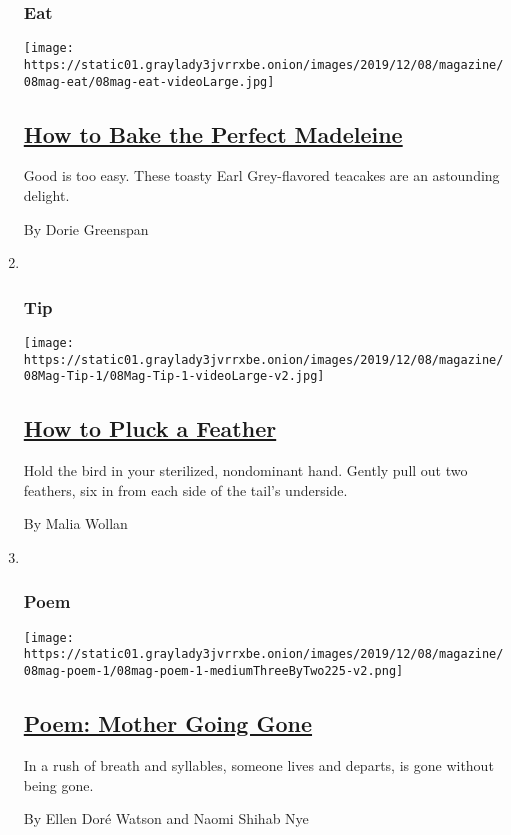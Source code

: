 \begin{enumerate}
{  \subsubsection{Eat}\label{eat}}

  \texttt{[image: https://static01.graylady3jvrrxbe.onion/images/2019/12/08/magazine/08mag-eat/08mag-eat-videoLarge.jpg]}

  \hypertarget{how-to-bake-the-perfect-madeleine}{%
  \subsection{\texorpdfstring{\href{/2019/12/03/magazine/how-to-bake-the-perfect-madeleine.html}{How
  to Bake the Perfect
  Madeleine}}{How to Bake the Perfect Madeleine}}\label{how-to-bake-the-perfect-madeleine}}

  Good is too easy. These toasty Earl Grey-flavored teacakes are an
  astounding delight.

  By Dorie Greenspan
\item ~
  \hypertarget{tip}{%
  \subsubsection{Tip}\label{tip}}

  \texttt{[image: https://static01.graylady3jvrrxbe.onion/images/2019/12/08/magazine/08Mag-Tip-1/08Mag-Tip-1-videoLarge-v2.jpg]}

  \hypertarget{how-to-pluck-a-feather}{%
  \subsection{\texorpdfstring{\href{/2019/12/05/magazine/how-to-pluck-a-feather.html}{How
  to Pluck a
  Feather}}{How to Pluck a Feather}}\label{how-to-pluck-a-feather}}

  Hold the bird in your sterilized, nondominant hand. Gently pull out
  two feathers, six in from each side of the tail's underside.

  By Malia Wollan
\item ~
  \hypertarget{poem}{%
  \subsubsection{Poem}\label{poem}}

  \texttt{[image: https://static01.graylady3jvrrxbe.onion/images/2019/12/08/magazine/08mag-poem-1/08mag-poem-1-mediumThreeByTwo225-v2.png]}

  \hypertarget{poem-mother-going-gone}{%
  \subsection{\texorpdfstring{\href{/2019/12/05/magazine/poem-mother-going-gone.html}{Poem:
  Mother Going
  Gone}}{Poem: Mother Going Gone}}\label{poem-mother-going-gone}}

  In a rush of breath and syllables, someone lives and departs, is gone
  without being gone.

  By Ellen Doré Watson and Naomi Shihab Nye
\end{enumerate}

